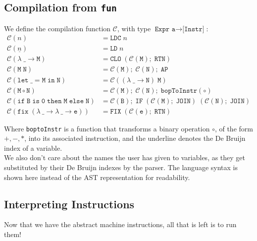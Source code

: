 \subsection{Compilation from \texttt{fun}}
We define the compilation function $ \mathcal{C} $, with type $ \texttt{Expr a} \to \texttt{[Instr]} $:
\[
\begin{aligned}
    \mathcal{C}(n) &= \mathtt{LDC}\; n \\
    \mathcal{C}(\underline{n}) &= \mathtt{LD}\; n \\
    \mathcal{C}(\mathtt{\lambda\; \_ \to M}) &= \mathtt{CLO}\; (\mathcal{C}(\mathtt{M});\; \mathtt{RTN}) \\
    \mathcal{C}(\mathtt{M\; N}) &= \mathcal{C}(\mathtt{M});\; \mathcal{C}(\mathtt{N});\; \mathtt{AP} \\
    \mathcal{C}(\mathtt{let\; \_ = M\; in\; N}) & = \mathcal{C}((\lambda\; \_ \to \mathtt{N})\; \mathtt{M}) \\
    \mathcal{C}(\mathtt{M \circ N}) &= \mathcal{C}(\mathtt{M});\; \mathcal{C}(\mathtt{N});\; \mathtt{bopToInstr}(\circ) \\
    \mathcal{C}(\mathtt{if\; B\; is\; 0\; then \; M\; else \; N}) &= \mathcal{C}(\mathtt{B});\; \mathtt{IF}\; (\mathcal{C}(\mathtt{M});\; \mathtt{JOIN})\; (\mathcal{C}(\mathtt{N});\; \mathtt{JOIN}) \\
    \mathcal{C}(\mathtt{fix\; (\lambda \ \_ \to \lambda \ \_ \to e)}) &= \mathtt{FIX}\; (\mathcal{C}(\mathtt{e});\; \mathtt{RTN})
\end{aligned}
\]

Where \texttt{boptoInstr} is a function that transforms a binary operation $\circ$, of the form $ +, -, * $, into its associated instruction, and the underline denotes
the De Bruijn index of a variable. \\
We also don't care about the names the user has given to variables, as they get substituted by their De Bruijn indexes by the parser. 
The language syntax is shown here instead of the AST representation for readability.

\subsection{Interpreting Instructions}
Now that we have the abstract machine instructions, all that is left is to run them!

